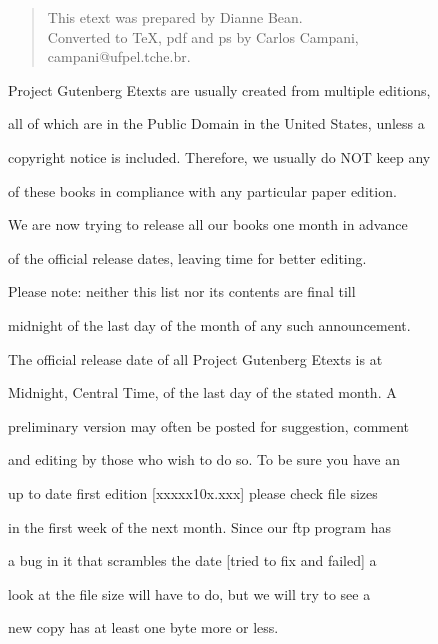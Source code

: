 \documentclass[12pt]{book}
\begin{document}
\begin{verse}

This etext was prepared by Dianne Bean. \\



Converted to \TeX, pdf and ps by Carlos Campani, \\

 campani@ufpel.tche.br.

\end{verse}



\newpage



Project Gutenberg Etexts are usually created from multiple editions,

all of which are in the Public Domain in the United States, unless a

copyright notice is included.  Therefore, we usually do NOT keep any

of these books in compliance with any particular paper edition.





We are now trying to release all our books one month in advance

of the official release dates, leaving time for better editing.



Please note:  neither this list nor its contents are final till

midnight of the last day of the month of any such announcement.

The official release date of all Project Gutenberg Etexts is at

Midnight, Central Time, of the last day of the stated month.  A

preliminary version may often be posted for suggestion, comment

and editing by those who wish to do so.  To be sure you have an

up to date first edition [xxxxx10x.xxx] please check file sizes

in the first week of the next month.  Since our ftp program has

a bug in it that scrambles the date [tried to fix and failed] a

look at the file size will have to do, but we will try to see a

new copy has at least one byte more or less.
\end{document}
